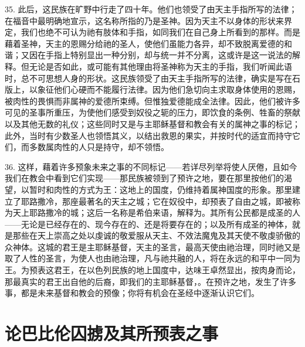 35. 此后，这民族在旷野中行走了四十年。他们也领受了由天主手指所写的法律；在福音中最明确地宣示，这名称所指的乃是圣神。因为天主不以身体的形状来界定，我们也绝不可认为祂有肢体和手指，如同我们在自己身上所看到的那样。而是藉着圣神，天主的恩赐分给祂的圣人，使他们虽能力各异，却不致脱离爱德的和谐；又因在手指上特别显出一种分别，却与统一并不分离，这或许是这一说法的解释。但无论是否如此，或可能有其他理由将圣神称为天主的手指，我们听闻此语时，总不可思想人身的形状。这民族领受了由天主手指所写的法律，确实是写在石版上，以象征他们心硬而不能履行法律。因为他们急切向主求取身体使用的恩赐，被肉性的畏惧而非属神的爱德所束缚。但惟独爱德能成全法律。因此，他们被许多可见的圣事所重压，为使他们感受到奴役之轭的压力，即饮食的条例、牲畜的祭献以及其他无数的礼仪；这些同时又是与主耶稣基督和教会有关的属神之事的标记；此外，当时有少数圣人也领悟其义，以结出救恩的果实，并按时代的适宜而持守它们，而多数属肉性的人只是持守，却不领悟。\par

36. 这样，藉着许多预象未来之事的不同标记——若详尽列举将使人厌倦，且如今我们在教会中看到它们实现——那民族被领到了预许之地，要在那里按他们的渴望，以暂时和肉性的方式为王：这地上的国度，仍维持着属神国度的形象。那里建立了耶路撒冷，那座最著名的天主之城；它在奴役中，却预表了自由之城，即被称为天上耶路撒冷的城；这后一名称是希伯来语，解释为。其所有公民都是成圣的人——无论是已经存在的、现今存在的、还是将要存在的；以及所有成圣的神体，就是那些在天上崇高之处以虔诚的敬爱服从天主、不效法魔鬼及其天使不敬虔骄傲的众神体。这城的君王是主耶稣基督，天主的圣言，最高天使由祂治理，同时祂又是取了人性的圣言，为使人也由祂治理，凡与祂共融的人，将在永远的和平中一同为王。为预表这君王，在以色列民族的地上国度中，达味王卓然显出，按肉身而论，那最真实的君王出自他的后裔，即我们的主耶稣基督，。在预许之地，发生了许多事，都是未来基督和教会的预像；你将有机会在圣经中逐渐认识它们。\par


\section{论巴比伦囚掳及其所预表之事}

